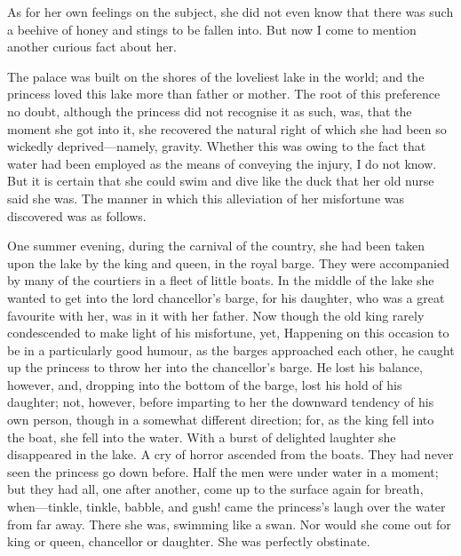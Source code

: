 \documentclass[12pt]{memoir}
\begin{document}
As for her own feelings on the subject, she did not even know that
there was such a beehive of honey and stings to be fallen into.  But
now I come to mention another curious fact about her.

The palace was built on the shores of the loveliest lake in the world;
and the princess loved this lake more than father or mother.  The root
of this preference no doubt, although the princess did not recognise
it as such, was, that the moment she got into it, she recovered the
natural right of which she had been so wickedly deprived---namely,
gravity.  Whether this was owing to the fact that water had been
employed as the means of conveying the injury, I do not know.  But it
is certain that she could swim and dive like the duck that her old
nurse said she was.  The manner in which this alleviation of her
misfortune was discovered was as follows.

One summer evening, during the carnival of the country, she had been
taken upon the lake by the king and queen, in the royal barge.  They
were accompanied by many of the courtiers in a fleet of little boats.
In the middle of the lake she wanted to get into the lord chancellor's
barge, for his daughter, who was a great favourite with her, was in it
with her father.  Now though the old king rarely condescended to make
light of his misfortune, yet, Happening on this occasion to be in a
particularly good humour, as the barges approached each other, he
caught up the princess to throw her into the chancellor's barge.  He
lost his balance, however, and, dropping into the bottom of the barge,
lost his hold of his daughter; not, however, before imparting to her
the downward tendency of his own person, though in a somewhat
different direction; for, as the king fell into the boat, she fell
into the water.  With a burst of delighted laughter she disappeared in
the lake.  A cry of horror ascended from the boats.  They had never
seen the princess go down before.  Half the men were under water in a
moment; but they had all, one after another, come up to the surface
again for breath, when---tinkle, tinkle, babble, and gush! came the
princess's laugh over the water from far away.  There she was,
swimming like a swan.  Nor would she come out for king or queen,
chancellor or daughter.  She was perfectly obstinate.
\end{document}

